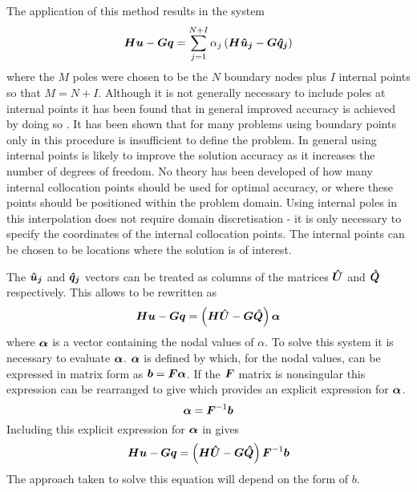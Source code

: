 The application of this method results in the system
\begin{equation}
  \matr{H} \vect{u} - \matr{G} \vect{q} = \dsuml{j=1}{N+I} \alpha_{j}
  \pbrac{\matr{H} \vect{\hat{u}_{j}} - \matr{G} \vect{\hat{q}_{j}}}
\label{eq:sumin}
\end{equation}
where the $M$ poles were chosen to be the $N$ boundary nodes plus $I$ internal
points so that $M = N+I$. Although it is not generally necessary to include
poles at internal points it has been found that in general improved accuracy
is achieved by doing so \citep{nowak:1992}.  It has been shown that for many
problems \citep{partridge:1992} \citep{cruse:1993} using boundary points only in
this procedure is insufficient to define the problem.  In general using
internal points is likely to improve the solution accuracy as it increases the
number of degrees of freedom.  No theory has been developed of how many
internal collocation points should be used for optimal accuracy, or where
these points should be positioned within the problem domain. Using internal
poles in this interpolation does not require domain discretisation - it is
only necessary to specify the coordinates of the internal collocation points.
The internal points can be chosen to be locations where the solution is of
interest.

The $\vect{\hat{u}_{j}}$ and $\vect{\hat{q}_{j}}$ vectors can be treated as
columns of the matrices $\matr{\hat{U}}$ and $\matr{\hat{Q}}$ respectively.
This allows  to be rewritten as
\begin{equation}
  \matr{H} \vect{u} - \matr{G} \vect{q} = \pbrac{\matr{H} \matr{\hat{U}} -
    \matr{G} \matr{\hat{Q}}} \vect{\alpha}
\label{eq:drmalpha}
\end{equation}
where $\vect{\alpha}$ is a vector containing the nodal values of $\alpha$.
To solve this system it is necessary to evaluate $\vect{\alpha}$.
$\vect{\alpha}$ is defined by  which, for the nodal
values, can be expressed in matrix form as $\vect{b} = \matr{F}
\matr{\alpha}$. If the $\matr{F}$ matrix is nonsingular this expression can
be rearranged to give  which provides an explicit
expression for $\matr{\alpha}$.
\begin{equation}
  \vect{\alpha} = \matr{F}^{-1} \vect{b}
\label{eq:expalpha}
\end{equation}
Including this explicit expression for $\vect{\alpha}$ in 
 gives
\begin{equation}
  \matr{H} \vect{u} - \matr{G} \vect{q} = \pbrac{\matr{H} \matr{\hat{U}} -
    \matr{G} \matr{\hat{Q}}} \matr{F}^{-1} \vect{b}
\label{eq:drmsystem}
\end{equation}
The approach taken to solve this equation will depend on the form of $b$.

